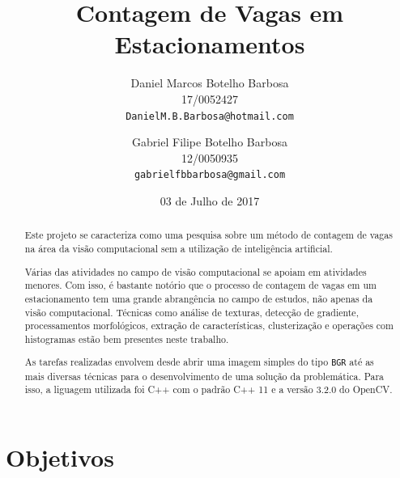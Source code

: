 \documentclass[10pt,twocolumn,letterpaper]{article}
\begin{document}
\title{Contagem de Vagas em Estacionamentos}

\date{03 de Julho de 2017}

\author{Daniel Marcos Botelho Barbosa\\
17/0052427\\
{\tt\small DanielM.B.Barbosa@hotmail.com}\\
\and
Gabriel Filipe Botelho Barbosa\\
12/0050935\\
{\tt\small gabrielfbbarbosa@gmail.com}
}

\maketitle






\begin{abstract}
	Este projeto se caracteriza como uma pesquisa sobre um método de contagem
de vagas na área da visão computacional sem a utilização de inteligência artificial.

	Várias das atividades no campo de visão computacional se apoiam em atividades
menores. Com isso, é bastante notório que o processo de contagem de vagas em um
estacionamento tem uma grande abrangência no campo de estudos, não apenas da
visão computacional. Técnicas como análise de texturas, detecção de gradiente,
processamentos morfológicos, extração de características, clusterização e operações
com histogramas estão bem presentes neste trabalho.

	As tarefas realizadas envolvem desde abrir uma imagem simples do tipo \verb'BGR'
até as mais diversas técnicas para o desenvolvimento de uma solução da problemática.
Para isso, a liguagem utilizada foi C++ com o padrão C++ 11 e a versão 3.2.0 do OpenCV.\\
\end{abstract}





\section{Objetivos}
\end{document}
